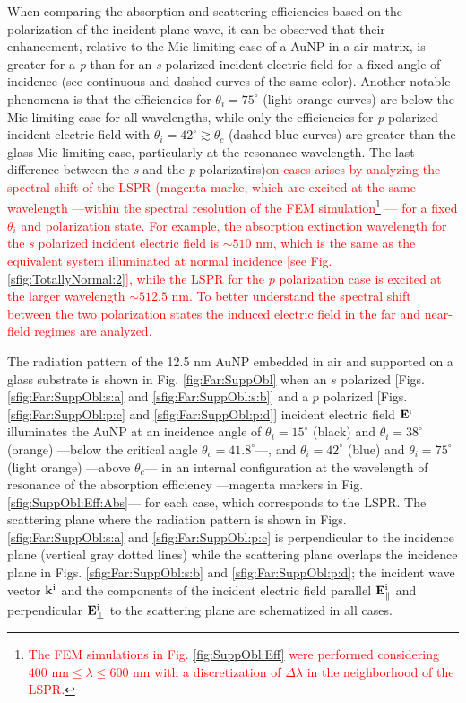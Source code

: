 When comparing the absorption and scattering efficiencies based on the polarization of the incident plane wave, it can be observed that their enhancement, relative to the Mie-limiting case of a AuNP in a air matrix, is greater for a  \textit{p} than for an \textit{s} polarized incident electric field for a fixed angle of incidence (see continuous and dashed curves of the same color). Another notable phenomena is that the  efficiencies for $\theta_i=75^\circ$ (light orange curves)  are below the Mie-limiting case for all wavelengths, while only the efficiencies for  \textit{p} polarized incident electric field with $\theta_i = 42^\circ \gtrsim \theta_c$ (dashed blue curves) are greater than the glass Mie-limiting case, particularly at the resonance wavelength. The last difference between the \textit{s} and the \textit{p} polarizatirs)\textcolor{red}{on cases arises by analyzing the spectral shift of the LSPR (magenta marke, which are excited at the same wavelength ---within the spectral resolution of the FEM simulation\footnote{\textcolor{red}{%
	The FEM simulations in Fig. \ref{fig:SuppObl:Eff} were performed considering $400\text{ nm}\leq \lambda \leq 600 \text{ nm}$ with a discretization of $\Delta \lambda$ in the neighborhood of the LSPR.}}%
--- for a fixed $\theta_i$ and polarization state. For example, the absorption extinction wavelength for the \textit{s} polarized incident electric field is $\sim 510$ nm, which is the same as the equivalent system illuminated at normal incidence [see Fig. \ref{sfig:TotallyNormal:2}], while the LSPR for the $p$ polarization case is excited at the larger wavelength $\sim 512.5$ nm. To better understand the spectral shift between the two polarization states the induced electric field in the far and near-field regimes are analyzed.}

The radiation pattern of the 12.5 nm AuNP embedded in air and supported on a glass substrate is shown in Fig. \ref{fig:Far:SuppObl} when an $s$ polarized [Figs. \ref{sfig:Far:SuppObl:s:a} and \ref{sfig:Far:SuppObl:s:b}] and a  $p$ polarized [Figs. \ref{sfig:Far:SuppObl:p:c} and \ref{sfig:Far:SuppObl:p:d}] incident electric field $\vb{E}^\text{i}$ illuminates the AuNP at an incidence angle of $\theta_i = 15^\circ$ (black) and $\theta_i = 38^\circ$ (orange) ---below the critical angle $\theta_c = 41.8^\circ$---, and $\theta_i = 42^\circ$ (blue) and $\theta_i = 75^\circ$ (light orange) ---above  $\theta_c$--- in an internal configuration at the wavelength of resonance of the absorption efficiency ---magenta markers in Fig. \ref{sfig:SuppObl:Eff:Abs}--- for each case, which corresponds to the LSPR. The scattering plane where the radiation pattern is shown in Figs. \ref{sfig:Far:SuppObl:s:a} and \ref{sfig:Far:SuppObl:p:c}  is perpendicular to the incidence plane (vertical gray dotted lines) while the scattering plane overlaps the incidence plane in Figs. \ref{sfig:Far:SuppObl:s:b} and \ref{sfig:Far:SuppObl:p:d}; the incident wave vector $\vb{k}^\text{i}$ and the components of the incident electric field parallel $\vb{E}^\text{i}_\parallel$ and perpendicular $\vb{E}^\text{i}_\perp$ to the scattering plane are schematized in all cases.

